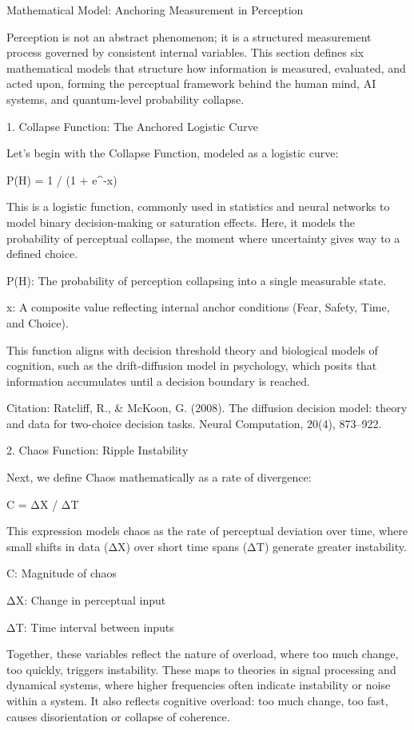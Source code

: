 \documentclass[11pt]{article}
\begin{document}
Mathematical Model: Anchoring Measurement in Perception

Perception is not an abstract phenomenon; it is a structured measurement process governed by consistent internal variables. This section defines six mathematical models that structure how information is measured, evaluated, and acted upon, forming the perceptual framework behind the human mind, AI systems, and quantum-level probability collapse.

1. Collapse Function: The Anchored Logistic Curve

Let’s begin with the Collapse Function, modeled as a logistic curve:

P(H) = 1 / (1 + e^-x)

This is a logistic function, commonly used in statistics and neural networks to model binary decision-making or saturation effects. Here, it models the probability of perceptual collapse, the moment where uncertainty gives way to a defined choice.

P(H): The probability of perception collapsing into a single measurable state.

x: A composite value reflecting internal anchor conditions (Fear, Safety, Time, and Choice).

This function aligns with decision threshold theory and biological models of cognition, such as the drift-diffusion model in psychology, which posits that information accumulates until a decision boundary is reached.

Citation: Ratcliff, R., & McKoon, G. (2008). The diffusion decision model: theory and data for two-choice decision tasks. Neural Computation, 20(4), 873–922.

2. Chaos Function: Ripple Instability

Next, we define Chaos mathematically as a rate of divergence:

C = ΔX / ΔT

This expression models chaos as the rate of perceptual deviation over time, where small shifts in data (ΔX) over short time spans (ΔT) generate greater instability.

C: Magnitude of chaos

ΔX: Change in perceptual input

ΔT: Time interval between inputs

Together, these variables reflect the nature of overload, where too much change, too quickly, triggers instability. These maps to theories in signal processing and dynamical systems, where higher frequencies often indicate instability or noise within a system. It also reflects cognitive overload: too much change, too fast, causes disorientation or collapse of coherence.
\end{document}
